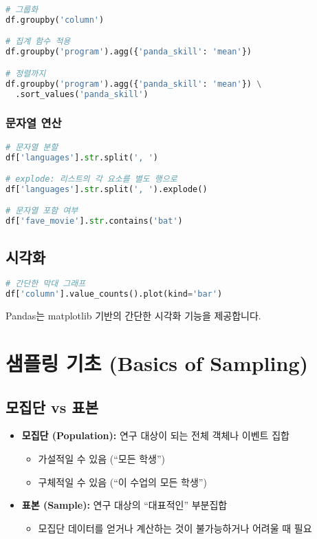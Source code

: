 \documentclass[12pt,a4paper]{article}
\begin{document}
\begin{lstlisting}[language=Python]
# 그룹화
df.groupby('column')

# 집계 함수 적용
df.groupby('program').agg({'panda_skill': 'mean'})

# 정렬까지
df.groupby('program').agg({'panda_skill': 'mean'}) \
  .sort_values('panda_skill')
\end{lstlisting}

\subsubsection{문자열 연산}

\begin{lstlisting}[language=Python]
# 문자열 분할
df['languages'].str.split(', ')

# explode: 리스트의 각 요소를 별도 행으로
df['languages'].str.split(', ').explode()

# 문자열 포함 여부
df['fave_movie'].str.contains('bat')
\end{lstlisting}

\subsection{시각화}

\begin{lstlisting}[language=Python]
# 간단한 막대 그래프
df['column'].value_counts().plot(kind='bar')
\end{lstlisting}

Pandas는 matplotlib 기반의 간단한 시각화 기능을 제공합니다.

\section{샘플링 기초 (Basics of Sampling)}

\subsection{모집단 vs 표본}

\begin{itemize}
    \item \textbf{모집단 (Population):} 연구 대상이 되는 전체 객체나 이벤트 집합
    \begin{itemize}
        \item 가설적일 수 있음 (``모든 학생'')
        \item 구체적일 수 있음 (``이 수업의 모든 학생'')
    \end{itemize}
    \item \textbf{표본 (Sample):} 연구 대상의 ``대표적인'' 부분집합
    \begin{itemize}
        \item 모집단 데이터를 얻거나 계산하는 것이 불가능하거나 어려울 때 필요
    \end{itemize}
\end{itemize}
\end{document}
